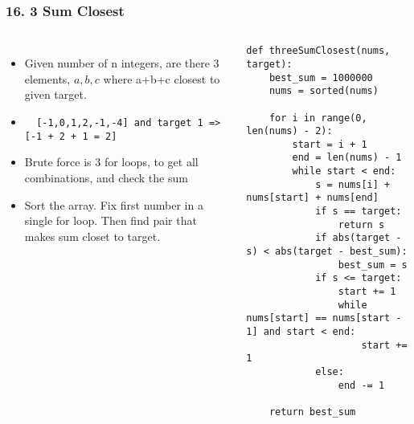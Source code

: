\begin{frame}[fragile]\frametitle{16. 3 Sum Closest}

	\begin{columns}[T]
	\begin{itemize}
	\item Given number of n integers, are there 3 elements, $a,b,c$ where a+b+c closest to given target.
	\item \lstinline{  [-1,0,1,2,-1,-4] and target 1 => [-1 + 2 + 1 = 2]}
	\item Brute force is 3 for loops, to get all combinations, and check the sum
	\item Sort the array. Fix first number in a single for loop. Then find pair that makes sum closet to target.
	\end{itemize}
		\begin{lstlisting}[basicstyle=\scriptsize]
def threeSumClosest(nums, target):
    best_sum = 1000000
    nums = sorted(nums)

    for i in range(0, len(nums) - 2):
        start = i + 1
        end = len(nums) - 1
        while start < end:
            s = nums[i] + nums[start] + nums[end]
            if s == target:
                return s
            if abs(target - s) < abs(target - best_sum):
                best_sum = s
            if s <= target:
                start += 1
                while nums[start] == nums[start - 1] and start < end:
                    start += 1
            else:
                end -= 1

    return best_sum
				\end{lstlisting}		

	\end{columns}
		
\end{frame}

